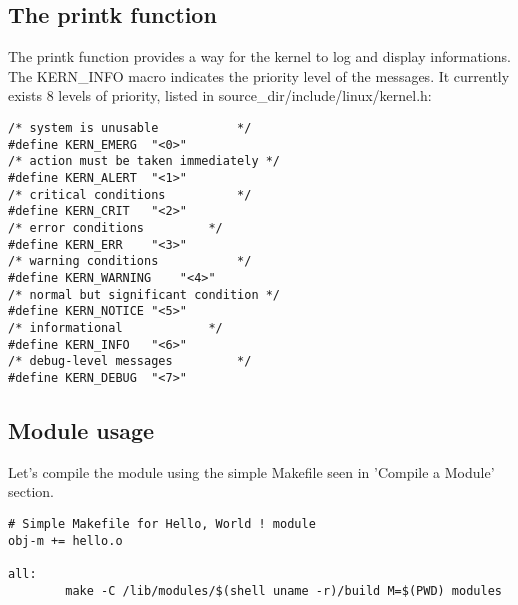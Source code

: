 \documentclass{article}
\begin{document}
\subsection{The printk function}
The printk function provides a way for the kernel
to log and display informations.
The KERN\_INFO macro indicates the priority level of
the messages. It currently exists 8 levels of priority, listed
in source\_dir/include/linux/kernel.h:
\begin{lstlisting}
/* system is unusable			*/
#define	KERN_EMERG	"<0>"
/* action must be taken immediately	*/
#define	KERN_ALERT	"<1>"
/* critical conditions			*/
#define	KERN_CRIT	"<2>"
/* error conditions			*/
#define	KERN_ERR	"<3>"
/* warning conditions			*/
#define	KERN_WARNING	"<4>"
/* normal but significant condition	*/
#define	KERN_NOTICE	"<5>"
/* informational			*/
#define	KERN_INFO	"<6>"
/* debug-level messages			*/
#define	KERN_DEBUG	"<7>"
\end{lstlisting}

\subsection{Module usage}
Let's compile the module using the simple Makefile seen in
'Compile a Module' section.
\begin{lstlisting}
# Simple Makefile for Hello, World ! module
obj-m += hello.o

all:
        make -C /lib/modules/$(shell uname -r)/build M=$(PWD) modules
\end{lstlisting}
\end{document}
